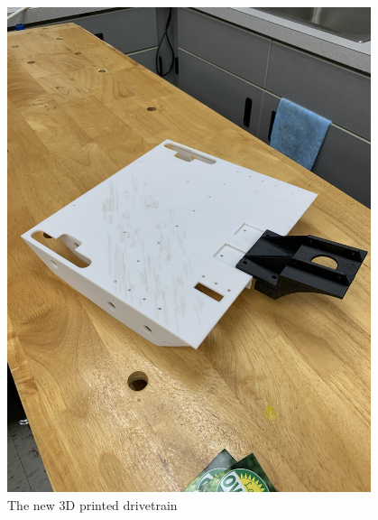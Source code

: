 \begin{figure}[ht]
\centering
\begin{minipage}[b]{.48\textwidth}
  \centering
  \includegraphics[width=0.95\textwidth]{Meetings/October/10-18-21/10-18-21_CAD_Figure1 - Nathan Forrer.JPG}
  \caption{The new 3D printed drivetrain}
  \label{fig:101821_1}
\end{minipage}%
\hfill%
\begin{minipage}[b]{.48\textwidth}
  \centering

\end{minipage}
\end{figure}
